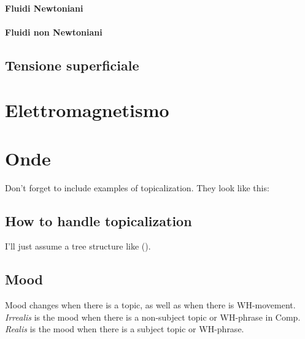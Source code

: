 \documentclass[12pt]{article}
\begin{document}
            \paragraph{Fluidi Newtoniani}
            \paragraph{Fluidi non Newtoniani}
    \subsection{Tensione superficiale}
\section{Elettromagnetismo}
\section{Onde}

Don't forget to include examples of topicalization.
They look like this:

{\small
{}
}

\subsection*{How to handle topicalization}

I'll just assume a tree structure like ().

{\small
{}
}

\subsection{Mood}

Mood changes when there is a topic, as well as when
there is WH-movement.  \emph{Irrealis} is the mood when
there is a non-subject topic or WH-phrase in Comp.
\emph{Realis} is the mood when there is a subject topic
or WH-phrase.
\end{document}

